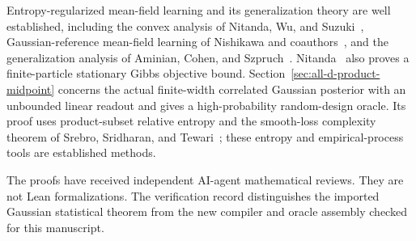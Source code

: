 \documentclass[11pt]{article}
\theoremstyle{remark}\newtheorem{remark}[theorem]{Remark}
\begin{document}
Entropy-regularized mean-field learning and its generalization theory
are well established, including the convex analysis of Nitanda, Wu,
and Suzuki~\cite{nitanda2022}, Gaussian-reference mean-field learning
of Nishikawa and coauthors~\cite{nishikawa2022}, and the generalization
analysis of Aminian, Cohen, and Szpruch~\cite{aminian2023}.
Nitanda~\cite{nitanda2024} also proves a finite-particle stationary
Gibbs objective bound. Section~\ref{sec:all-d-product-midpoint} concerns
the actual finite-width correlated Gaussian posterior with an
unbounded linear readout and gives a high-probability random-design
oracle. Its proof uses product-subset relative entropy and the
smooth-loss complexity theorem of Srebro, Sridharan, and
Tewari~\cite{sst}; these entropy and empirical-process tools are
established methods.

The proofs have received independent AI-agent mathematical reviews.
They are not Lean formalizations. The verification record distinguishes
the imported Gaussian statistical theorem from the new compiler and
oracle assembly checked for this manuscript.

\appendix

\end{document}
